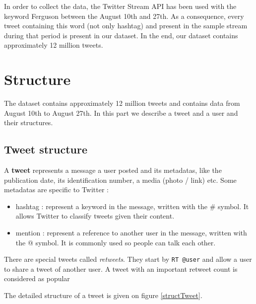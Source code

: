 \documentclass[a4paper,twoside,12pt,openright]{report}
\begin{document}
In order to collect the data, the Twitter Stream API has been used with the keyword Ferguson between the August 10th and 27th. As a consequence, every tweet containing this word (not only hashtag) and present in the sample stream during that period is present in our dataset. In the end, our dataset contains approximately 12 million tweets.

\newpage

\section{Structure}
The dataset contains approximately 12 million tweets and contains data from August 10th to August 27th. In this part we describe a tweet and a user and their structures.

\subsection{Tweet structure}
A \textbf{tweet} represents a message a user posted and its metadatas, like the publication date, its identification number, a media (photo / link) etc. Some metadatas are specific to Twitter : 
\begin{itemize}
\item hashtag : represent a keyword in the message, written with the \# symbol. It allows Twitter to classify tweets given their content.
\item mention : represent a reference to another user in the message, written with the @ symbol. It is commonly used so people can talk each other.
\end{itemize}
There are special tweets called \emph{retweets}. They start by \texttt{RT @user} and allow a user to share a tweet of another user. A tweet with an important retweet count is considered as popular

The detailed structure of a tweet is given on figure \ref{structTweet}.
\end{document}
